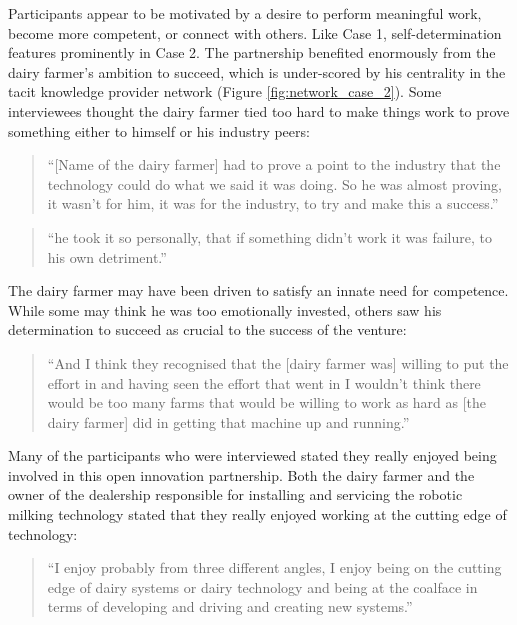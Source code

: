 Participants appear to be motivated by a desire to perform meaningful work, become more competent, or connect with others. Like Case 1, self-determination features prominently in Case 2. The partnership benefited enormously from the dairy farmer's ambition to succeed, which is under-scored by his centrality in the tacit knowledge provider network (Figure \ref{fig:network_case_2}). Some interviewees thought the dairy farmer tied too hard to make things work to prove something either to himself or his industry peers:

\begin{quote}
\small
\enquote{[Name of the dairy farmer] had to prove a point to the industry that the technology could do what we said it was doing.  So he was almost proving, it wasn't for him, it was for the industry, to try and make this a success.} \\
\end{quote}

\begin{quote}
\small
\enquote{he took it so personally, that if something didn't work it was failure, to his own detriment.} \\
\end{quote}
 
The dairy farmer may have been driven to satisfy an innate need for competence. While some may think he was too emotionally invested, others saw his determination to succeed as crucial to the success of the venture:

\begin{quote}
\small
\enquote{And I think they recognised that the [dairy farmer was] willing to put the effort in and having seen the effort that went in I wouldn't think there would be too many farms that would be willing to work as hard as [the dairy farmer] did in getting that machine up and running.} \\
\end{quote}

Many of the participants who were interviewed stated they really enjoyed being involved in this open innovation partnership. Both the dairy farmer and the owner of the dealership responsible for installing and servicing the robotic milking technology stated that they really enjoyed working at the cutting edge of technology:

\begin{quote}
\small
\enquote{I enjoy probably from three different angles, I enjoy being on the cutting edge of dairy systems or dairy technology and being at the coalface in terms of developing and driving and creating new systems.} \\
\end{quote}

